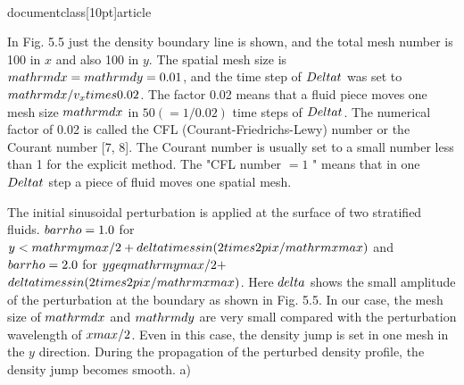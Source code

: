 \\documentclass[10pt]{article}
\begin{document}
{In Fig. 5.5 just the density boundary line is shown, and the total mesh number is 100 in $x$ and also 100 in $y$. The spatial mesh size is $\\mathrm{d} x=\\mathrm{d} y=0.01$, and the time step of $\\Delta t$ was set to $\\mathrm{d} x / v_{x} \\times 0.02$. The factor 0.02 means that a fluid piece moves one mesh size $\\mathrm{d} x$ in $50(=1 / 0.02)$ time steps of $\\Delta t$. The numerical factor of 0.02 is called the CFL (Courant-Friedrichs-Lewy) number or the Courant number [7, 8]. The Courant number is usually set to a small number less than 1 for the explicit method. The "CFL number $=1$ " means that in one $\\Delta t$ step a piece of fluid moves one spatial mesh.

The initial sinusoidal perturbation is applied at the surface of two stratified fluids. $\\bar{\\rho}=1.0$ for $y<\\mathrm{ymax} / 2+\\delta \\times \\sin (2 \\times 2 \\pi x / \\mathrm{xmax})$ and $\\bar{\\rho}=2.0$ for $y \\geq \\mathrm{ymax} / 2+$ $\\delta \\times \\sin (2 \\times 2 \\pi x / \\mathrm{xmax})$. Here $\\delta$ shows the small amplitude of the perturbation at the boundary as shown in Fig. 5.5. In our case, the mesh size of $\\mathrm{d} x$ and $\\mathrm{d} y$ are very small compared with the perturbation wavelength of $x \\max / 2$. Even in this case, the density jump is set in one mesh in the $y$ direction. During the propagation of the perturbed density profile, the density jump becomes smooth.
a)

}
\end{document}

